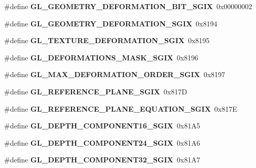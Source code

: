 \begin{DoxyCompactItemize}
\item 
\#define {\bfseries G\+L\+\_\+\+G\+E\+O\+M\+E\+T\+R\+Y\+\_\+\+D\+E\+F\+O\+R\+M\+A\+T\+I\+O\+N\+\_\+\+B\+I\+T\+\_\+\+S\+G\+I\+X}~0x00000002\label{_s_d_l__opengl_8h_a69a772d206d2ca96bd26a1732ea44188}

\item 
\#define {\bfseries G\+L\+\_\+\+G\+E\+O\+M\+E\+T\+R\+Y\+\_\+\+D\+E\+F\+O\+R\+M\+A\+T\+I\+O\+N\+\_\+\+S\+G\+I\+X}~0x8194\label{_s_d_l__opengl_8h_ac88f142424cf49c09af72490a531fef6}

\item 
\#define {\bfseries G\+L\+\_\+\+T\+E\+X\+T\+U\+R\+E\+\_\+\+D\+E\+F\+O\+R\+M\+A\+T\+I\+O\+N\+\_\+\+S\+G\+I\+X}~0x8195\label{_s_d_l__opengl_8h_aef9d3b9ca1984a732cbccf1076f88110}

\item 
\#define {\bfseries G\+L\+\_\+\+D\+E\+F\+O\+R\+M\+A\+T\+I\+O\+N\+S\+\_\+\+M\+A\+S\+K\+\_\+\+S\+G\+I\+X}~0x8196\label{_s_d_l__opengl_8h_a1eb7448de38a38a3e8b53f38e54001e3}

\item 
\#define {\bfseries G\+L\+\_\+\+M\+A\+X\+\_\+\+D\+E\+F\+O\+R\+M\+A\+T\+I\+O\+N\+\_\+\+O\+R\+D\+E\+R\+\_\+\+S\+G\+I\+X}~0x8197\label{_s_d_l__opengl_8h_ade5ec06703f2743f4b6161a32f6ee0f6}

\item 
\#define {\bfseries G\+L\+\_\+\+R\+E\+F\+E\+R\+E\+N\+C\+E\+\_\+\+P\+L\+A\+N\+E\+\_\+\+S\+G\+I\+X}~0x817\+D\label{_s_d_l__opengl_8h_a8d5107e36252eed548405743b58b9d2f}

\item 
\#define {\bfseries G\+L\+\_\+\+R\+E\+F\+E\+R\+E\+N\+C\+E\+\_\+\+P\+L\+A\+N\+E\+\_\+\+E\+Q\+U\+A\+T\+I\+O\+N\+\_\+\+S\+G\+I\+X}~0x817\+E\label{_s_d_l__opengl_8h_a1c169657d62b7195accca1e9199d906c}

\item 
\#define {\bfseries G\+L\+\_\+\+D\+E\+P\+T\+H\+\_\+\+C\+O\+M\+P\+O\+N\+E\+N\+T16\+\_\+\+S\+G\+I\+X}~0x81\+A5\label{_s_d_l__opengl_8h_a6d917ddf4600cbe3bd800858dd3e87c7}

\item 
\#define {\bfseries G\+L\+\_\+\+D\+E\+P\+T\+H\+\_\+\+C\+O\+M\+P\+O\+N\+E\+N\+T24\+\_\+\+S\+G\+I\+X}~0x81\+A6\label{_s_d_l__opengl_8h_aff3bebdc355c913cdd81238ed698bd0e}

\item 
\#define {\bfseries G\+L\+\_\+\+D\+E\+P\+T\+H\+\_\+\+C\+O\+M\+P\+O\+N\+E\+N\+T32\+\_\+\+S\+G\+I\+X}~0x81\+A7\label{_s_d_l__opengl_8h_a957d381f2202d8c7b1f31b7a057058d0}


\end{DoxyCompactItemize}
